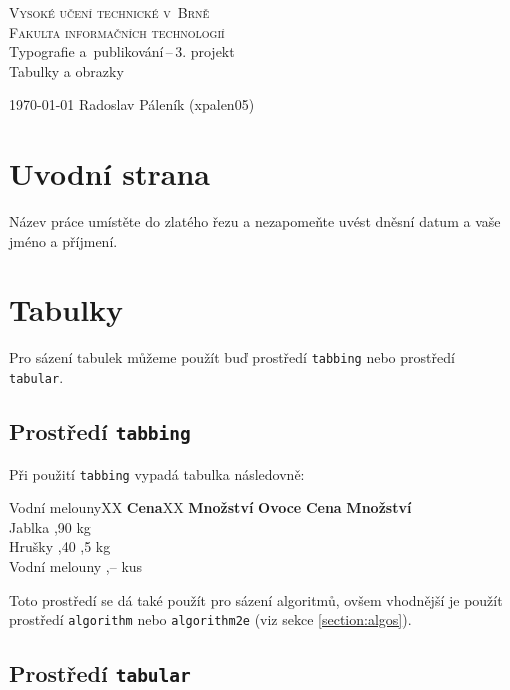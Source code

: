 \documentclass[a4paper, 11pt]{article}
\begin{document}
\begin{titlepage}
\begin{center}
    {\Huge
    \textsc{ Vysoké učení technické v~Brně\\\huge Fakulta informačních technologií}\\
    }
    \LARGE{Typografie a~publikování\,--\,3. projekt\\
    \Huge Tabulky a obrazky\\}
\end{center}
{\Large \today \hfill
Radoslav Páleník (xpalen05)}
\end{titlepage}

\section{Uvodní strana}
Název práce umístěte do zlatého řezu a nezapomeňte uvést dněsní datum a vaše jméno a příjmení.
\section{Tabulky}
Pro sázení tabulek můžeme použít buď prostředí \texttt{tabbing} nebo prostředí \texttt{tabular}.

\subsection{Prostředí \texttt{tabbing}}
Při použití \texttt{tabbing} vypadá tabulka následovně:
\begin{tabbing}
Vodní melounyXX   \= \textbf{Cena}XX    \= \textbf{Množství}        \kill
\textbf{Ovoce}  \> \textbf{Cena}    \> \textbf{Množství}    \\ 
Jablka          ,90             kg                 \\
Hrušky          ,40            ,5 kg               \\
Vodní melouny   ,–              kus                \\
\end{tabbing}
Toto prostředí se dá také použít pro sázení algoritmů, ovšem vhodnější je použít prostředí \texttt{algorithm} nebo \texttt{algorithm2e} (viz sekce \ref{section:algos}).

\subsection{Prostředí \texttt{tabular}}
\end{document}
